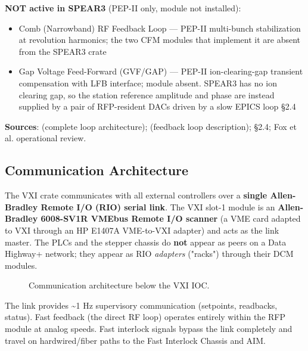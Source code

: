 \textbf{NOT active in SPEAR3} (PEP-II only, module not installed):

\begin{itemize}
\tightlist
\item
  Comb (Narrowband) RF Feedback Loop --- PEP-II multi-bunch stabilization at revolution harmonics; the two CFM modules that implement it are absent from the SPEAR3 crate
\item
  Gap Voltage Feed-Forward (GVF/GAP) --- PEP-II ion-clearing-gap transient compensation with LFB interface; module absent. SPEAR3 has no ion clearing gap, so the station reference amplitude and phase are instead supplied by a pair of RFP-resident DACs driven by a slow EPICS loop  §2.4
\end{itemize}

\begin{keynote}
\textbf{Sources}:  (complete loop architecture);  (feedback loop description);  §2.4;  Fox et al. operational review.
\end{keynote}

\subsection{Communication Architecture}

The VXI crate communicates with all external controllers over a \textbf{single Allen-Bradley Remote I/O (RIO) serial link}. The VXI slot-1 module is an \textbf{Allen-Bradley 6008-SV1R VMEbus Remote I/O scanner} (a VME card adapted to VXI through an HP E1407A VME-to-VXI adapter) and acts as the link master. The PLCs and the stepper chassis do \textbf{not} appear as peers on a Data Highway+ network; they appear as RIO \emph{adapters} ("racks") through their DCM modules.

\begin{figure}[tbp]\centering
\begin{fitpicture}\end{fitpicture}
\caption{Communication architecture below the VXI IOC.}\label{fig:comms-tree}
\end{figure}

The link provides \textasciitilde1 Hz supervisory communication (setpoints, readbacks, status). Fast feedback (the direct RF loop) operates entirely within the RFP module at analog speeds. Fast interlock signals bypass the link completely and travel on hardwired/fiber paths to the Fast Interlock Chassis and AIM.

